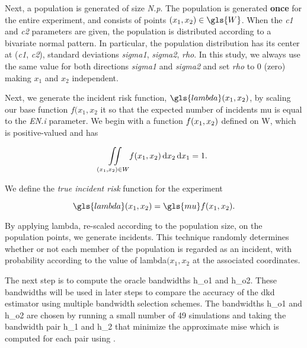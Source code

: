 Next, a population is generated of size \textit{N.p}.
The population is generated \textbf{once} for the entire experiment, and consists of points $\xvec \in \gls{W}$.
When the \textit{c1} and \textit{c2} parameters are given, the population is distributed according to a bivariate normal pattern.
In particular, the population distribution has its center at (\textit{c1}, \textit{c2}),
standard deviations \textit{sigma1}, \textit{sigma2}, \textit{rho}.
In this study, we always use the same value for both directions \textit{sigma1} and \textit{sigma2} and set \textit{rho} to 0 (zero) making $x_1$ and $x_2$ independent.

Next, we generate the incident risk function, $\gls{lambda}\xvec$, by scaling our base function $f(x_1, x_2$ it so that the expected number of incidents \gls{mu} is equal to the \textit{EN.i} parameter.
We begin with a function $f(x_1, x_2)$ defined on \gls{W}, which is positive-valued and has 

\begin{equation*}
    \iint\limits_{(x_1, x_2) \in W}\!{f(x_1, x_2) \mathop{}\!\mathrm{d}{x_2} \mathop{}\!\mathrm{d}{x_1}} = 1 \text{.}
\end{equation*}

We define the \textit{true incident risk} function for the experiment

\begin{equation}
    \gls{lambda}\xvec = \gls{mu} f\xvec \text{.}
\end{equation}

By applying \gls{lambda}, re-scaled according to the population size, on the population points, we generate incidents.
This technique randomly determines whether or not each member of the population is regarded as an incident, with probability according to the value of \gls{lambda}$(x_1, x_2$ at the associated coordinates.

The next step is to compute the \gls{oracle} bandwidths \gls{h_o1} and \gls{h_o2}.
These bandwidths will be used in later steps to compare the accuracy of the \gls{dkd} estimator using multiple bandwidth selection schemes.
The bandwidths \gls{h_o1} and \gls{h_o2} are chosen by running a small number of 49 simulations and taking the bandwidth pair \gls{h_1} and \gls{h_2} that minimize the approximate \gls{mise} which is computed for each pair using .

